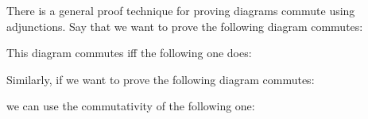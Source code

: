 There is a general proof technique for proving diagrams commute using adjunctions. Say that we want to prove the following diagram commutes:

\begin{center}
\end{center}

This diagram commutes iff the following one does:

\begin{center}
\end{center}

Similarly, if we want to prove the following diagram commutes:

\begin{center}
\end{center}

we can use the commutativity of the following one:

\begin{center}
\end{center}

